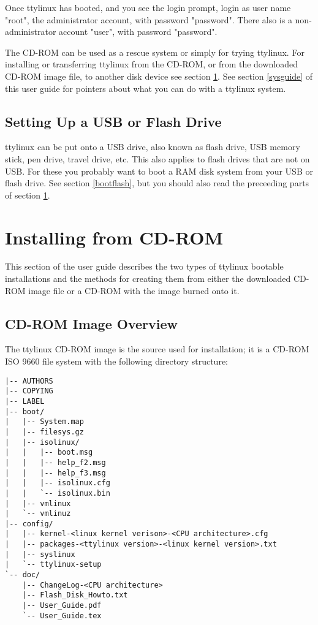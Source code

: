 \documentclass[10pt]{article}
\begin{document}
Once ttylinux has booted, and you see the login prompt, login as user name
"root", the administrator account, with password "password". There also is a
non-administrator account "user", with password "password".

The CD-ROM can be used as a rescue system or simply for trying ttylinux. For
installing or transferring ttylinux from the CD-ROM, or from the downloaded
CD-ROM image file, to another disk device see section \ref{installation}. See
section \ref{sysguide} of this user guide for pointers about what you can do
with a ttylinux system.

\subsection{Setting Up a USB or Flash Drive}

ttylinux can be put onto a USB drive, also known as flash drive, USB memory
stick, pen drive, travel drive, etc. This also applies to flash drives that are
not on USB. For these you probably want to boot a RAM disk system from your USB
or flash drive. See section \ref{bootflash}, but you should also read the
preceeding parts of section \ref{installation}.

\newpage
\section{Installing from CD-ROM}
\label{installation}

This section of the user guide describes the two types of ttylinux bootable
installations and the methods for creating them from either the downloaded
CD-ROM image file or a CD-ROM with the image burned onto it.

\subsection{CD-ROM Image Overview}

The ttylinux CD-ROM image is the source used for installation; it is a CD-ROM
ISO 9660 file system with the following directory structure:

\begin{lstlisting}
|-- AUTHORS
|-- COPYING
|-- LABEL
|-- boot/
|   |-- System.map
|   |-- filesys.gz
|   |-- isolinux/
|   |   |-- boot.msg
|   |   |-- help_f2.msg
|   |   |-- help_f3.msg
|   |   |-- isolinux.cfg
|   |   `-- isolinux.bin
|   |-- vmlinux
|   `-- vmlinuz
|-- config/
|   |-- kernel-<linux kernel verison>-<CPU architecture>.cfg
|   |-- packages-<ttylinux version>-<linux kernel version>.txt
|   |-- syslinux
|   `-- ttylinux-setup
`-- doc/
    |-- ChangeLog-<CPU architecture>
    |-- Flash_Disk_Howto.txt
    |-- User_Guide.pdf
    `-- User_Guide.tex
\end{lstlisting}
\end{document}
